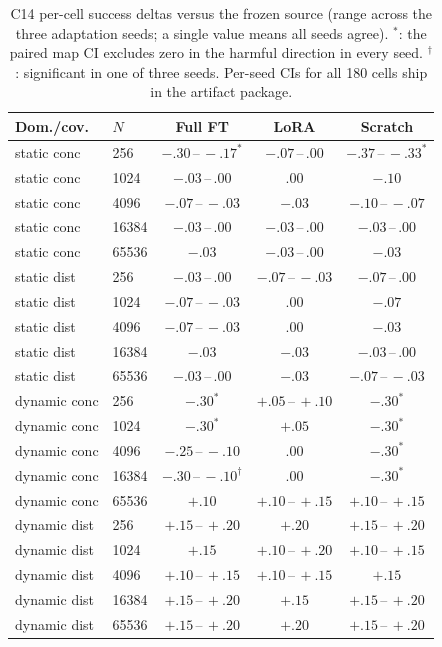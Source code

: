 \documentclass[letterpaper]{article} %
\newcommand{\stage}[1]{\textsc{#1}}
\begin{document}
\begin{table}[t]
\centering
\small
\setlength{\tabcolsep}{2.2pt}
\begin{tabular}{@{}llccc@{}}
\toprule
Dom./cov. & $N$ & Full FT & LoRA & Scratch \\
\midrule
static conc & 256 & $-.30\,$--$\,-.17^{*}$ & $-.07\,$--$\,.00$ & $-.37\,$--$\,-.33^{*}$ \\
static conc & 1024 & $-.03\,$--$\,.00$ & $.00$ & $-.10$ \\
static conc & 4096 & $-.07\,$--$\,-.03$ & $-.03$ & $-.10\,$--$\,-.07$ \\
static conc & 16384 & $-.03\,$--$\,.00$ & $-.03\,$--$\,.00$ & $-.03\,$--$\,.00$ \\
static conc & 65536 & $-.03$ & $-.03\,$--$\,.00$ & $-.03$ \\
static dist & 256 & $-.03\,$--$\,.00$ & $-.07\,$--$\,-.03$ & $-.07\,$--$\,.00$ \\
static dist & 1024 & $-.07\,$--$\,-.03$ & $.00$ & $-.07$ \\
static dist & 4096 & $-.07\,$--$\,-.03$ & $.00$ & $-.03$ \\
static dist & 16384 & $-.03$ & $-.03$ & $-.03\,$--$\,.00$ \\
static dist & 65536 & $-.03\,$--$\,.00$ & $-.03$ & $-.07\,$--$\,-.03$ \\
dynamic conc & 256 & $-.30^{*}$ & $+.05\,$--$\,+.10$ & $-.30^{*}$ \\
dynamic conc & 1024 & $-.30^{*}$ & $+.05$ & $-.30^{*}$ \\
dynamic conc & 4096 & $-.25\,$--$\,-.10$ & $.00$ & $-.30^{*}$ \\
dynamic conc & 16384 & $-.30\,$--$\,-.10^{\dagger}$ & $.00$ & $-.30^{*}$ \\
dynamic conc & 65536 & $+.10$ & $+.10\,$--$\,+.15$ & $+.10\,$--$\,+.15$ \\
dynamic dist & 256 & $+.15\,$--$\,+.20$ & $+.20$ & $+.15\,$--$\,+.20$ \\
dynamic dist & 1024 & $+.15$ & $+.10\,$--$\,+.20$ & $+.10\,$--$\,+.15$ \\
dynamic dist & 4096 & $+.10\,$--$\,+.15$ & $+.10\,$--$\,+.15$ & $+.15$ \\
dynamic dist & 16384 & $+.15\,$--$\,+.20$ & $+.15$ & $+.15\,$--$\,+.20$ \\
dynamic dist & 65536 & $+.15\,$--$\,+.20$ & $+.20$ & $+.15\,$--$\,+.20$ \\
\bottomrule
\end{tabular}
\caption{\stage{C14} per-cell success deltas versus the frozen source (range across the three adaptation seeds; a single value means all seeds agree). $^{*}$: the paired map CI excludes zero in the harmful direction in every seed. $^{\dagger}$: significant in one of three seeds. Per-seed CIs for all 180 cells ship in the artifact package.}
\label{tab:c14cells}
\end{table}
\end{document}
